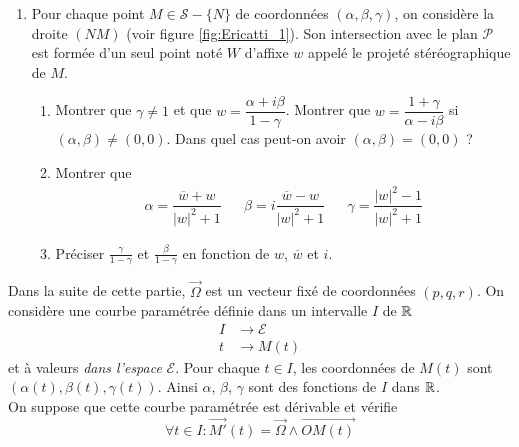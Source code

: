 \begin{enumerate}
\item Pour chaque point $M\in \mathcal S-\{N\}$ de coordonnées $(\alpha,\beta,\gamma)$, on considère la droite $(NM)$ (voir figure \ref{fig:Ericatti_1}). Son intersection avec le plan $\mathcal P$ est formée d'un seul point noté $W$ d'affixe $w$ appelé le projeté stéréographique de $M$.
\begin{enumerate}
 \item  Montrer que $\gamma \neq 1$ et que $w = \dfrac{\alpha + i\beta}{1- \gamma}$.
Montrer que $w = \dfrac{1+\gamma}{\alpha -i\beta}$  si $(\alpha,\beta)\neq(0,0)$.
Dans quel cas peut-on avoir $(\alpha,\beta)=(0,0)$ ? 
\item Montrer que
\begin{align*}
 \alpha = \dfrac{\overline{w}+w}{|w|^2+1} & & 
\beta = i\dfrac{\overline{w}-w}{|w|^2+1} & & 
\gamma =  \dfrac{|w|^2-1}{|w|^2+1}
\end{align*}
\item Préciser $\frac{\gamma}{1-\gamma}$ et $\frac{\beta}{1-\gamma}$ en fonction de $w$, $\overline{w}$ et $i$.
\end{enumerate}
\end{enumerate}
Dans la suite de cette partie, $\overrightarrow\Omega$ est un vecteur fixé de coordonnées $(p,q,r)$. On considère une courbe paramétrée définie dans un intervalle $I$ de $\mathbb{R}$
\begin{displaymath}
 \begin{aligned}
  I &\rightarrow \mathcal E\\
  t &\rightarrow M(t)
 \end{aligned}
\end{displaymath}
et à valeurs \emph{dans l'espace} $\mathcal E$. Pour chaque $t\in I$, les coordonnées de $M(t)$ sont $(\alpha(t),\beta(t),\gamma(t))$. Ainsi $\alpha$, $\beta$, $\gamma$ sont des fonctions de $I$ dans $\mathbb{R}$.\\
On suppose que cette courbe paramétrée est dérivable et vérifie
\begin{displaymath}
 \forall t\in I : \overrightarrow{M'}(t) = \overrightarrow{\Omega} \wedge \overrightarrow{OM(t)}
\end{displaymath}

